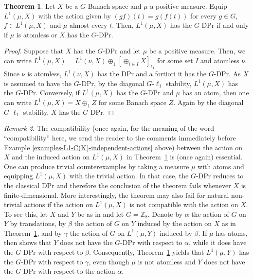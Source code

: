 \documentclass[a4paper,12pt]{amsart}
\theoremstyle{definition}
\newtheorem{theorem}{Theorem}[section]
\theoremstyle{definition}
\theoremstyle{remark}
\newtheorem{remark}[theorem]{Remark}
\numberwithin{equation}{section}
\newcommand{\<}{\langle}
\renewcommand{\>}{\rangle}
\begin{document}
	
	\begin{theorem} \label{L1(X,mu)-iff} Let $X$ be a $G$-Banach space and $\mu$ a positive measure. Equip $L^1(\mu, X)$ with the action given by $(gf)(t) = g(f(t))$ for every $g \in G$, $f \in L^1(\mu, X)$ and $\mu$-almost every $t$. Then, $L^1(\mu, X)$ has the $G$-DPr if and only if $\mu$ is atomless or $X$ has the $G$-DPr.
	\end{theorem}
	
	\begin{proof} Suppose that $X$ has the $G$-DPr and let $\mu$ be a positive measure. Then, we can write $L^1(\mu, X) = L^1(\nu, X) \oplus_1 [ \oplus_{i \in I} X ]_{\ell_1}$ for some set $I$ and atomless $\nu$. Since $\nu$ is atomless, $L^1(\nu, X)$ has the DPr and a fortiori it has the $G$-DPr. As $X$ is assumed to have the $G$-DPr, by the diagonal $G$-$\ell_1$ stability, $L^1(\mu, X)$ has the $G$-DPr. Conversely, if $L^1(\mu, X)$ has the $G$-DPr and $\mu$ has an atom, then one can write $L^1(\mu, X) = X \oplus_1 Z$ for some Banach space $Z$. Again by the diagonal $G$-$\ell_1$ stability, $X$ has the $G$-DPr.
	\end{proof}
	
	
	\begin{remark} 
		The compatibility (once again, for the meaning of the word ``compatibility'' here, we send the reader to the comments immediately before Example \ref{examples-L1-C(K)-independent-actions} above) between the action on $X$ and the induced action on $L^1(\mu,X)$ in Theorem~\ref{L1(X,mu)-iff} is (once again) essential. One can produce trivial counterexamples by taking a measure $\mu$ with atoms and equipping $L^1(\mu,X)$ with the trivial action. In that case, the $G$-DPr reduces to the classical DPr and therefore the conclusion of the theorem fails whenever $X$ is finite-dimensional. More interestingly, the theorem may also fail for natural non-trivial actions if the action on $L^1(\mu,X)$ is not compatible with the action on $X$. To see this, let $X$ and $Y$ be as in  and let $G=\mathbb Z_8$. Denote by $\alpha$ the action of $G$ on $Y$ by translations, by $\beta$ the action of $G$ on $Y$ induced by the action on $X$ as in Theorem~\ref{L1(X,mu)-iff}, and by $\gamma$ the action of $G$ on $L^1(\mu,Y)$ induced by $\beta$. If $\mu$ has atoms, then  shows that $Y$ does not have the $G$-DPr with respect to $\alpha$, while it does have the $G$-DPr with respect to $\beta$. Consequently, Theorem~\ref{L1(X,mu)-iff} yields that $L^1(\mu,Y)$ has the $G$-DPr with respect to $\gamma$, even though $\mu$ is not atomless and $Y$ does not have the $G$-DPr with respect to the action $\alpha$.
	\end{remark}
	
\end{document}
